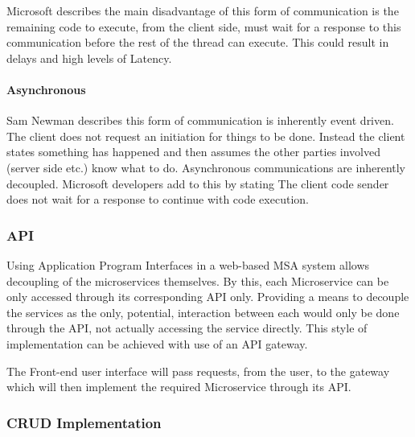 	Microsoft \cite{.NetMSA} describes the main disadvantage of this form of communication is the remaining code to execute, from the client side, must wait for a response to this communication before the rest of the thread can execute. This could result in delays and high levels of Latency.
	\paragraph{Asynchronous}
	Sam Newman \cite{NewmanMSA} describes this form of communication is inherently event driven. The client does not request an initiation for things to be done. Instead the client states something has happened and then assumes the other parties involved (server side etc.) know what to do. Asynchronous communications are inherently decoupled. 
	Microsoft developers \cite{.NetMSA} add to this by stating The client code sender does not wait for a response to continue with code execution.
\subsubsection{API}
Using Application Program Interfaces in a web-based MSA system allows decoupling of the microservices themselves. By this, each Microservice can be only accessed through its corresponding API only. Providing a means to decouple the services as the only, potential, interaction between each would only be done through the API, not actually accessing the service directly. This style of implementation can be achieved with use of an API gateway.

The Front-end user interface will pass requests, from the user, to the gateway which will then implement the required Microservice through its API.
\subsubsection{CRUD Implementation}